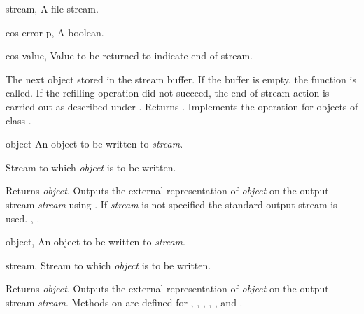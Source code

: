 \begin{optDefinition}
\begin{specargs}
    \item[stream, \classref{file-stream}] A file stream.
    \item[eos-error-p, \classref{object}] A boolean.
    \item[eos-value, \classref{object}] Value to be returned to indicate end of
    stream.
\end{specargs}
%
\result%
The next object stored in the stream buffer.  If the buffer is empty,
the function  is called. If the refilling operation did
not succeed, the end of stream action is carried out as described under
.  Returns \true.
%
\remarks%
Implements the  operation for objects of class
.


\begin{arguments}
    \item[object] An object to be written to {\em stream}.
    \item[\optional{stream}] Stream to which {\em object\/} is
    to be written.
\end{arguments}
%
\result%
Returns {\em object}.
%
\remarks%
Outputs the external representation of {\em object\/} on the output
stream {\em stream\/} using .  If {\em stream\/} is
not specified the standard output stream is used.
%
\seealso%
, .

\begin{genericargs}
    \item[object, \classref{object}] An object to be written to {\em stream}.
    \item[stream, \classref{stream}] Stream to which {\em object\/} is to be written.
\end{genericargs}
%
\result%
Returns {\em object}.
%
\remarks%
Outputs the external representation of {\em object\/} on the output stream
{\em stream}.
%
\seealso%
Methods on  are defined for
, , ,
, ,  and .


\end{optDefinition}
